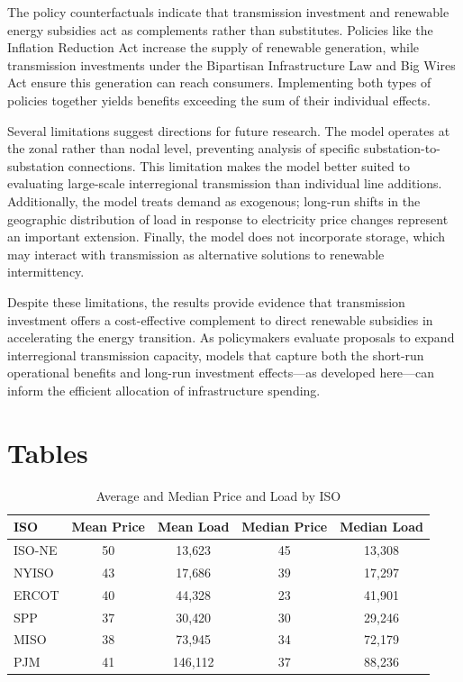 \documentclass[12pt]{article}
\begin{document}
The policy counterfactuals indicate that transmission investment and renewable energy subsidies act as complements rather than substitutes. Policies like the Inflation Reduction Act increase the supply of renewable generation, while transmission investments under the Bipartisan Infrastructure Law and Big Wires Act ensure this generation can reach consumers. Implementing both types of policies together yields benefits exceeding the sum of their individual effects.

Several limitations suggest directions for future research. The model operates at the zonal rather than nodal level, preventing analysis of specific substation-to-substation connections. This limitation makes the model better suited to evaluating large-scale interregional transmission than individual line additions. Additionally, the model treats demand as exogenous; long-run shifts in the geographic distribution of load in response to electricity price changes represent an important extension. Finally, the model does not incorporate storage, which may interact with transmission as alternative solutions to renewable intermittency.

Despite these limitations, the results provide evidence that transmission investment offers a cost-effective complement to direct renewable subsidies in accelerating the energy transition. As policymakers evaluate proposals to expand interregional transmission capacity, models that capture both the short-run operational benefits and long-run investment effects---as developed here---can inform the efficient allocation of infrastructure spending.

\singlespacing
\setlength\bibsep{0pt}
\printbibliography




\clearpage

\onehalfspacing

\section*{Tables} \label{sec:tab}

\begin{table}[htbp]
\centering
\begin{tabular}{lcccc}
\toprule
\textbf{ISO} & \textbf{Mean Price} & \textbf{Mean Load} & \textbf{Median Price} & \textbf{Median Load} \\
\midrule
ISO-NE & 50 & 13{,}623 & 45 & 13{,}308 \\
NYISO  & 43 & 17{,}686 & 39 & 17{,}297 \\
ERCOT  & 40 & 44{,}328 & 23 & 41{,}901 \\
SPP    & 37 & 30{,}420 & 30 & 29{,}246 \\
MISO   & 38 & 73{,}945 & 34 & 72{,}179 \\
PJM    & 41 & 146{,}112 & 37 & 88{,}236 \\
\bottomrule
\end{tabular}
\caption{Average and Median Price and Load by ISO}
\label{priceData}
\end{table}
\end{document}

